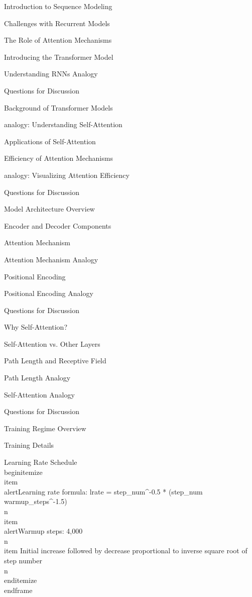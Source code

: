 \documentclass{beamer}
\begin{document}
\begin{frame}[]{Introduction to Sequence Modeling}
\begin{frame}[]{Challenges with Recurrent Models}
\begin{frame}[]{The Role of Attention Mechanisms}
\begin{frame}[]{Introducing the Transformer Model}
\begin{frame}[plain]{Understanding RNNs Analogy}
\begin{frame}[]{Questions for Discussion}
\begin{frame}[]{Background of Transformer Models}
\begin{frame}[plain]{analogy: Understanding Self-Attention}
\begin{frame}[]{Applications of Self-Attention}
\begin{frame}[]{Efficiency of Attention Mechanisms}
\begin{frame}[plain]{analogy: Visualizing Attention Efficiency}
\begin{frame}[]{Questions for Discussion}
\begin{frame}[]{Model Architecture Overview}
\begin{frame}[]{Encoder and Decoder Components}
\begin{frame}[]{Attention Mechanism}
\begin{frame}[plain]{Attention Mechanism Analogy}
\begin{frame}[]{Positional Encoding}
\begin{frame}[plain]{Positional Encoding Analogy}
\begin{frame}[]{Questions for Discussion}
\begin{frame}[]{Why Self-Attention?}
\begin{frame}[]{Self-Attention vs. Other Layers}
\begin{frame}[]{Path Length and Receptive Field}
\begin{frame}[plain]{Path Length Analogy}
\begin{frame}[plain]{Self-Attention Analogy}
\begin{frame}[]{Questions for Discussion}
\begin{frame}[]{Training Regime Overview}
\begin{frame}[]{Training Details}
\begingroup
{}\n{}\n\begin{frame}[]{Learning Rate Schedule}\n\\begin{itemize}
\\item \\alert{Learning rate formula: lrate = step\_num\textasciicircum{}-0.5 * (step\_num warmup\_steps\textasciicircum{}-1.5)}\\n\\item \\alert{Warmup steps: 4,000}\\n\\item Initial increase followed by decrease proportional to inverse square root of step number\\n\\end{itemize}
\\end{frame}

\endgroup


\end{frame}
\end{frame}
\end{frame}
\end{frame}
\end{frame}
\end{frame}
\end{frame}
\end{frame}
\end{frame}
\end{frame}
\end{frame}
\end{frame}
\end{frame}
\end{frame}
\end{frame}
\end{frame}
\end{frame}
\end{frame}
\end{frame}
\end{frame}
\end{frame}
\end{frame}
\end{frame}
\end{frame}
\end{frame}
\end{frame}
\end{frame}
\end{frame}
\end{document}
